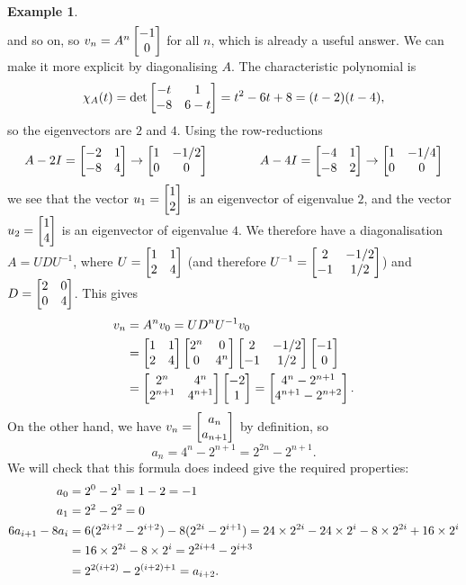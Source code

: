 \documentclass[reqno]{amsart}
\theoremstyle{definition}
\newtheorem{example}[theorem]{Example}
\begin{document}
\begin{example}
\begin{align*}
 \end{align*}
 and so on, so $v_n=A^n\left[\begin{matrix} -1\\ 0\end{matrix}\right]$ for all $n$, which is already
 a useful answer.  We can make it more explicit by diagonalising $A$.
 The characteristic polynomial is
 \[ \chi_A(t) = \det\left[\begin{matrix} -t&1 \\ -8&6-t\end{matrix}\right] =
     t^2-6t+8 = (t-2)(t-4),
 \]
 so the eigenvectors are $2$ and $4$.  Using the row-reductions
 \[ A-2I = \left[\begin{matrix} -2&1\\-8&4\end{matrix}\right] \to \left[\begin{matrix} 1&-1/2\\0&0\end{matrix}\right]
    \hspace{4em}
    A-4I = \left[\begin{matrix} -4&1\\-8&2\end{matrix}\right] \to \left[\begin{matrix} 1&-1/4\\0&0\end{matrix}\right]
 \]
 we see that the vector $u_1=\left[\begin{matrix} 1\\2\end{matrix}\right]$ is an eigenvector of
 eigenvalue $2$, and the vector $u_2=\left[\begin{matrix} 1\\4\end{matrix}\right]$ is an
 eigenvector of eigenvalue $4$.  We therefore have a diagonalisation
 $A=UDU^{-1}$, where $U=\left[\begin{matrix} 1&1\\2&4\end{matrix}\right]$ (and therefore
 $U^{-1}=\left[\begin{matrix} 2&-1/2\\-1&1/2\end{matrix}\right]$) and $D=\left[\begin{matrix} 2&0\\0&4\end{matrix}\right]$.  This
 gives 
 \begin{align*}
  v_n &= A^nv_0 = UD^nU^{-1}v_0 \\
      &= \left[\begin{matrix} 1&1\\2&4\end{matrix}\right]\left[\begin{matrix} 2^n&0\\ 0&4^n\end{matrix}\right]
         \left[\begin{matrix} 2&-1/2\\-1&1/2\end{matrix}\right]\left[\begin{matrix} -1\\0\end{matrix}\right] \\
      &= \left[\begin{matrix} 2^n & 4^n \\ 2^{n+1} & 4^{n+1} \end{matrix}\right]
         \left[\begin{matrix} -2 \\ 1 \end{matrix}\right] 
       = \left[\begin{matrix} 4^n-2^{n+1} \\ 4^{n+1}-2^{n+2} \end{matrix}\right].
 \end{align*}
 On the other hand, we have $v_n=\left[\begin{matrix} a_n\\ a_{n+1}\end{matrix}\right]$ by
 definition, so 
 \[ a_n = 4^n-2^{n+1} = 2^{2n} - 2^{n+1}. \]
 We will check that this formula does indeed give the required
 properties:
 \begin{align*}
  a_0 &= 2^0 - 2^1 = 1-2 = -1 \\
  a_1 &= 2^2 - 2^2 = 0 \\
  6a_{i+1}-8a_i
      &= 6(2^{2i+2}-2^{i+2}) - 8(2^{2i}-2^{i+1})
       = 24\times 2^{2i} - 24\times 2^i - 8 \times 2^{2i} + 16 \times 2^i \\
      &= 16\times 2^{2i} - 8\times 2^i = 2^{2i+4} - 2^{i+3} \\
      &= 2^{2(i+2)} - 2^{(i+2)+1} = a_{i+2}.
 \end{align*}
\end{example}
\end{document}
